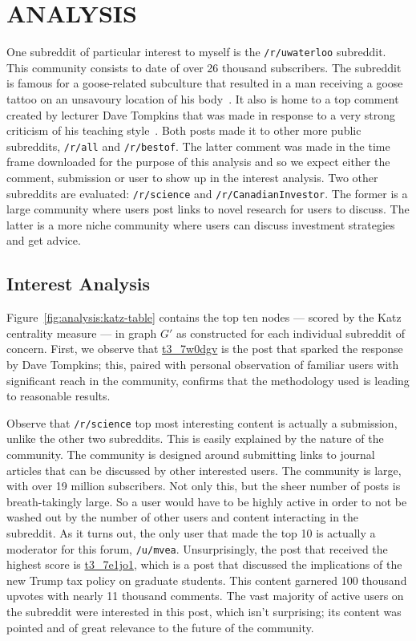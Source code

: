 \documentclass[letterpaper, 10 pt, conference]{ieeeconf}
\theoremstyle{definition}
\begin{document}
\section{ANALYSIS}\label{sec:analysis}
One subreddit of particular interest to myself is the \texttt{/r/uwaterloo} subreddit. This community consists to date of over 26 thousand subscribers. The subreddit is famous for a goose-related subculture that resulted in a man receiving a goose tattoo on an unsavoury location of his body~\cite{Website:GooseTattoo}. It also is home to a top comment created by lecturer Dave Tompkins that was made in response to a very strong criticism of his teaching style~\cite{Website:dtompkins}. Both posts made it to other more public subreddits, \texttt{/r/all} and \texttt{/r/bestof}. The latter comment was made in the time frame downloaded for the purpose of this analysis and so we expect either the comment, submission or user to show up in the interest analysis. Two other subreddits are evaluated: \texttt{/r/science} and \texttt{/r/CanadianInvestor}. The former is a large community where users post links to novel research for users to discuss. The latter is a more niche community where users can discuss investment strategies and get advice.

\subsection{Interest Analysis}
Figure~\ref{fig:analysis:katz-table} contains the top ten nodes --- scored by the Katz centrality measure --- in graph \(G'\) as constructed for each individual subreddit of concern. First, we observe that \href{https://reddit.com/r/uwaterloo/comments/7w0dgv}{t3\_7w0dgv} is the post that sparked the response by Dave Tompkins; this, paired with personal observation of familiar users with significant reach in the community, confirms that the methodology used is leading to reasonable results.

Observe that \texttt{/r/science} top most interesting content is actually a submission, unlike the other two subreddits. This is easily explained by the nature of the community. The community is designed around submitting links to journal articles that can be discussed by other interested users. The community is large, with over 19 million subscribers. Not only this, but the sheer number of posts is breath-takingly large. So a user would have to be highly active in order to not be washed out by the number of other users and content interacting in the subreddit. As it turns out, the only user that made the top 10 is actually a moderator for this forum, \texttt{/u/mvea}. Unsurprisingly, the post that received the highest score is \href{https://reddit.com/r/science/comments/7e1jo1}{t3\_7e1jo1}, which is a post that discussed the implications of the new Trump tax policy on graduate students. This content garnered 100 thousand upvotes with nearly 11 thousand comments. The vast majority of active users on the subreddit were interested in this post, which isn't surprising; its content was pointed and of great relevance to the future of the community.
\end{document}
